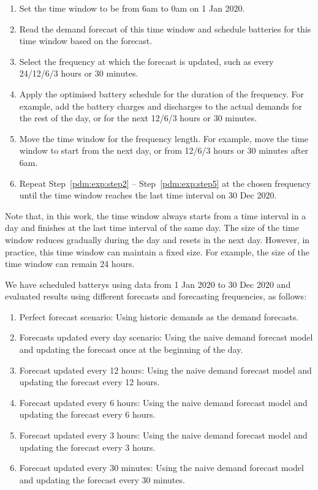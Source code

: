 \begin{enumerate}
	\item Set the time window to be from 6am to 0am on 1 Jan 2020. 
	
	\item Read the demand forecast of this time window and schedule batteries for this time window based on the forecast. \label{pdm:exp:step2}
	
	\item Select the frequency at which the forecast is updated, such as every 24/12/6/3 hours or 30 minutes.
	
	\item Apply the optimised battery schedule for the duration of the frequency. For example, add the battery charges and discharges to the actual demands for the rest of the day, or for the next 12/6/3 hours or 30 minutes.
	
	\item Move the time window for the frequency length. For example, move the time window to start from the next day, or from 12/6/3 hours or 30 minutes after 6am.  \label{pdm:exp:step5}
	
	\item Repeat Step~\ref{pdm:exp:step2} -- Step~\ref{pdm:exp:step5} at the chosen frequency until the time window reaches the last time interval on 30 Dec 2020. 
	
\end{enumerate}
Note that, in this work, the time window always starts from a time interval in a day and finishes at the last time interval of the same day. The size of the time window reduces gradually during the day and resets in the next day. However, in practice, this time window can maintain a fixed size. For example, the size of the time window can remain 24 hours.

We have scheduled \glspl{battery} using data from 1 Jan 2020 to 30 Dec 2020 and evaluated results using different forecasts and forecasting frequencies, as follows:
\begin{enumerate}
	\item Perfect forecast scenario: Using historic demands as the demand forecasts. 
	
	\item Forecasts updated every day scenario: Using the naive demand forecast model and updating the forecast once at the beginning of the day. 
	
	\item Forecast updated every 12 hours: Using the naive demand forecast model and updating the forecast every 12 hours. 
	
	\item Forecast updated every 6 hours: Using the naive demand forecast model and updating the forecast every 6 hours. 
	
	\item Forecast updated every 3 hours: Using the naive demand forecast model and updating the forecast every 3 hours. 
	
	\item Forecast updated every 30 minutes: Using the naive demand forecast model and updating the forecast every 30 minutes. 
\end{enumerate}

